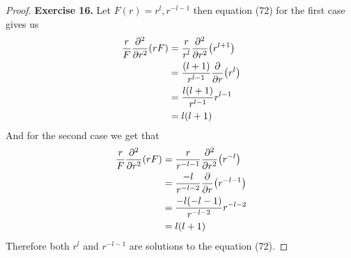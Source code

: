 \documentclass[11pt]{article}
\theoremstyle{definition}
\begin{document}
\cleardoublepage
\begin{proof}{\textbf{Exercise 16.}}
Let $F(r) = r^l, r^{-l-1}$ then equation (72) for the first case gives us
\begin{align*}
    \frac{r}{F}\pdv[2]{r}(rF)
    &= \frac{r}{r^l}\pdv[2]{r}(r^{l+1})\\
    &= \frac{(l + 1)}{r^{l-1}}\pdv{r}(r^l)\\
    &= \frac{l(l + 1)}{r^{l-1}}r^{l -1}\\
    &= l(l + 1)
\end{align*}
And for the second case we get that
\begin{align*}
    \frac{r}{F}\pdv[2]{r}(rF)
    &= \frac{r}{r^{-l-1}}\pdv[2]{r}(r^{-l})\\
    &= \frac{-l}{r^{-l-2}}\pdv{r}(r^{-l -1})\\
    &= \frac{-l(-l - 1)}{r^{-l-2}}r^{-l -2}\\
    &= l(l + 1)
\end{align*}
Therefore both $r^l$ and $r^{-l-1}$ are solutions to the equation (72).
\end{proof}
\end{document}
